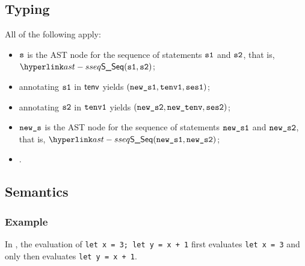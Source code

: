 \subsection{Typing}
\ProseParagraph
All of the following apply:
\begin{itemize}
  \item $\vs$ is the AST node for the sequence of statements $\vsone$ and $\vstwo$, that is, $\SSeq(\vsone, \vstwo)$;
  \item annotating $\vsone$ in $\tenv$ yields $(\newsone, \tenvone, \vsesone)$\ProseOrTypeError;
  \item annotating $\vstwo$ in $\tenvone$ yields $(\newstwo, \newtenv, \vsestwo)$\ProseOrTypeError;
  \item $\news$ is the AST node for the sequence of statements $\newsone$ and $\newstwo$, that is, $\SSeq(\newsone, \newstwo)$;
  \item {}.
\end{itemize}
\FormallyParagraph
\begin{mathpar}
\end{mathpar}

\subsection{Semantics}
\subsubsection{Example}
In ,
the evaluation of \texttt{let x = 3; let y = x + 1} first evaluates \texttt{let x = 3} and only then
evaluates \texttt{let y = x + 1}.

